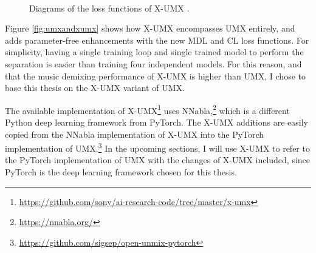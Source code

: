 \documentclass[report.tex]{subfiles}
\begin{document}
\begin{figure}[ht]
	\centering
	\\
	\caption{Diagrams of the loss functions of X-UMX \parencite[2]{xumx}.}
	\label{fig:xumxlosses}
\end{figure}

Figure \ref{fig:umxandxumx} shows how X-UMX encompasses UMX entirely, and adds parameter-free enhancements with the new MDL and CL loss functions. For simplicity, having a single training loop and single trained model to perform the separation is easier than training four independent models. For this reason, and that the music demixing performance of X-UMX is higher than UMX, I chose to base this thesis on the X-UMX variant of UMX.

The available implementation of X-UMX\footnote{\url{https://github.com/sony/ai-research-code/tree/master/x-umx}} uses NNabla,\footnote{\url{https://nnabla.org/}} which is a different Python deep learning framework from PyTorch. The X-UMX additions are easily copied from the NNabla implementation of X-UMX into the PyTorch implementation of UMX.\footnote{\url{https://github.com/sigsep/open-unmix-pytorch}} In the upcoming sections, I will use X-UMX to refer to the PyTorch implementation of UMX with the changes of X-UMX included, since PyTorch is the deep learning framework chosen for this thesis.
\end{document}
